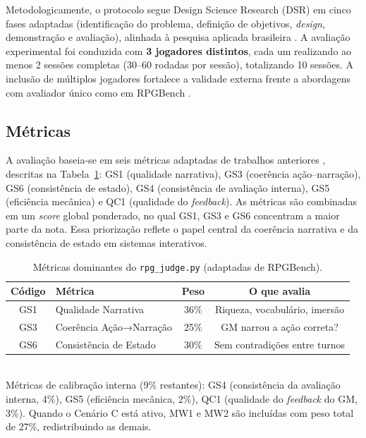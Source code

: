 \documentclass[12pt]{article}
\begin{document}
Metodologicamente, o protocolo segue Design Science Research (DSR) \cite{hevner:2004,peffers:2007,pimentel:2020} em cinco fases adaptadas (identificação do problema, definição de objetivos, \textit{design}, demonstração e avaliação), alinhada à pesquisa aplicada brasileira \cite{pimentel:2020}. A avaliação experimental foi conduzida com \textbf{3 jogadores distintos}, cada um realizando ao menos 2 sessões completas (30--60 rodadas por sessão), totalizando 10 sessões. A inclusão de múltiplos jogadores fortalece a validade externa frente a abordagens com avaliador único como em RPGBench \cite{yu:2025}.

\subsection{Métricas}
\label{sec:metricas}

A avaliação baseia-se em seis métricas adaptadas de trabalhos anteriores \cite{yu:2025}, descritas na Tabela~\ref{tab:metricas}: GS1 (qualidade narrativa), GS3 (coerência ação--narração), GS6 (consistência de estado), GS4 (consistência de avaliação interna), GS5 (eficiência mecânica) e QC1 (qualidade do \textit{feedback}). As métricas são combinadas em um \textit{score} global ponderado, no qual GS1, GS3 e GS6 concentram a maior parte da nota. Essa priorização reflete o papel central da coerência narrativa e da consistência de estado em sistemas interativos.

\begin{table}[ht]
\centering
\caption{Métricas dominantes do \texttt{rpg\_judge.py} (adaptadas de RPGBench).}
\label{tab:metricas}
\begin{tabular}{clcc}
\toprule
\textbf{Código} & \textbf{Métrica} & \textbf{Peso} & \textbf{O que avalia} \\
\midrule
GS1 & Qualidade Narrativa     & 36\% & Riqueza, vocabulário, imersão \\
GS3 & Coerência Ação→Narração & 25\% & GM narrou a ação correta? \\
GS6 & Consistência de Estado  & 30\% & Sem contradições entre turnos \\
\bottomrule
\end{tabular}
\\[2pt]
{\footnotesize Métricas de calibração interna (9\% restantes): GS4 (consistência da avaliação interna, 4\%), GS5 (eficiência mecânica, 2\%), QC1 (qualidade do \textit{feedback} do GM, 3\%). Quando o Cenário C está ativo, MW1 e MW2 são incluídas com peso total de 27\%, redistribuindo as demais.}
\end{table}
\end{document}
